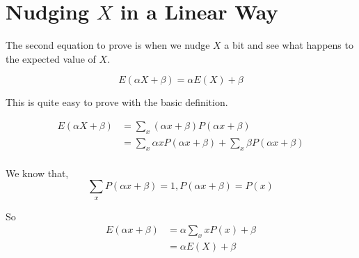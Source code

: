 \documentclass{article}
\begin{document}
\section{Nudging $X$ in a Linear Way}
The second equation to prove is when we nudge $X$ a bit and see what happens to the expected value of $X$.

\begin{equation}
	E(\alpha X+\beta) = \alpha E(X) + \beta
\end{equation}

This is quite easy to prove with the basic definition.

\begin{equation}
	\begin{aligned}
		E(\alpha X + \beta) &= \sum_x (\alpha x + \beta)P(\alpha x + \beta) \\
		&=\sum_x \alpha x P(\alpha x + \beta) + \sum_x \beta P(\alpha x + \beta) \\
	\end{aligned}
\end{equation} 

We know that,
\begin{equation}
			\sum_{x} P(\alpha x + \beta) = 1, P(\alpha x + \beta) = P(x)
\end{equation}

So
\begin{equation}
\begin{aligned}
		E(\alpha x + \beta) &= \alpha \sum_x x P(x) + \beta \\
		&= \alpha E(X) + \beta
\end{aligned}
\end{equation}

	
\end{document}
